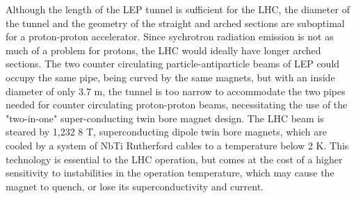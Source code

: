 \indent Although the length of the LEP tunnel is sufficient for the LHC, the diameter of the tunnel and the geometry of the straight and arched sections are suboptimal for a proton-proton accelerator. Since sychrotron radiation emission is not as much of a problem for protons, the LHC would ideally have longer arched sections. The two counter circulating particle-antiparticle beams of LEP could occupy the same pipe, being curved by the same magnets, but with an inside diameter of only 3.7 m, the tunnel is too narrow to accommodate the two pipes needed for counter circulating proton-proton beams, necessitating the use of the "two-in-one" super-conducting twin bore magnet design. The LHC beam is steared by 1,232 8 T, superconducting dipole twin bore magnets, which are cooled by a system of NbTi Rutherford cables to a temperature below 2 K. This technology is essential to the LHC operation, but comes at the cost of a higher sensitivity to instabilities in the operation temperature, which may cause the magnet to quench, or lose its superconductivity and current.

